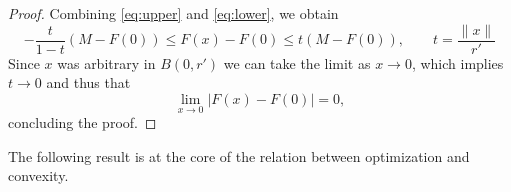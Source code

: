 \begin{proof}
     Combining \eqref{eq:upper} and \eqref{eq:lower}, we obtain
     \begin{equation}
         - \frac{t}{1-t}(M-F(0)) \le F(x)-F(0) \le t(M-F(0)), \qquad t=\frac{\|x\|}{r'}
     \end{equation}
     Since $x$ was arbitrary in $B(0,r')$ we can take the limit as $x\to 0$, which implies $t\to 0$ and thus that
     \begin{equation}
         \lim_{x\to 0}|F(x)-F(0)|=0,
     \end{equation}
     concluding the proof.
 \end{proof}
 
 The following result is at the core of the relation between optimization and convexity.
 
 
